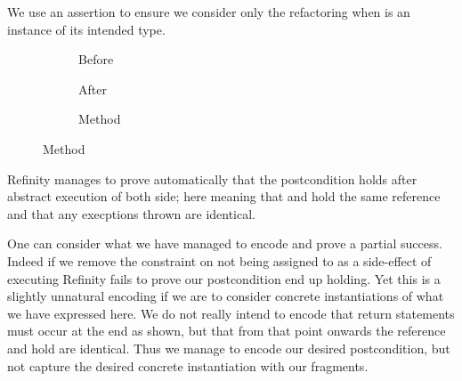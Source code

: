 We use an assertion to ensure we consider only the refactoring when  is an instance of its intended type.

\begin{figure}[!h]
  \centering
  \begin{subfigure}[b]{.34\linewidth}
    
    \vspace{-2mm}
    \caption{Before}
    \label{lst:ExtractVariable-refinity-before}
  \end{subfigure}\hspace{1cm}
  \begin{subfigure}[b]{.34\linewidth}
    
    \vspace{-2mm}
    \caption{After}
    \label{lst:ExtractVariable-refinity-after}
  \end{subfigure}\vspace{4mm}
  \begin{subfigure}[b]{.65\linewidth}
    
    \vspace{-2mm}
    \caption{Method}
    \label{lst:ExtractVariable-refinity-method}
  \end{subfigure}
\label{lst:ExtractVariable-refinity}
\end{figure}

Refinity manages to prove automatically that the postcondition holds after abstract execution of both side; here meaning that
 and  hold the same reference and that any execptions thrown are identical.

One can consider what we have managed to encode and prove a partial success.
Indeed if we remove the constraint on  not being assigned to as a side-effect of executing   Refinity fails to prove our postcondition end up holding.
Yet this is a slightly unnatural encoding if we are to consider concrete instantiations of what we have expressed here.
We do not really intend to encode that return statements must occur at the end as shown, but that from that point onwards the reference  and  hold
are identical. Thus we manage to encode our desired postcondition, but not capture the desired concrete instantiation with our fragments.


